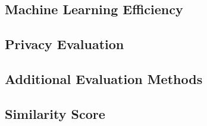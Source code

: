 \subsection{Machine Learning Efficiency}
\label{ch:preliminaries-evaluationOfSyntheticTabularData-machineLearningEfficiency}

\subsection{Privacy Evaluation}
\label{ch:preliminaries-evaluationOfSyntheticTabularData-privacyEvaluation}

\subsection{Additional Evaluation Methods}
\label{ch:preliminaries-evaluationOfSyntheticTabularData-otherMetrics}


\subsection{Similarity Score}
\label{ch:preliminaries-evaluationOfSyntheticTabularData-similarityScore}






